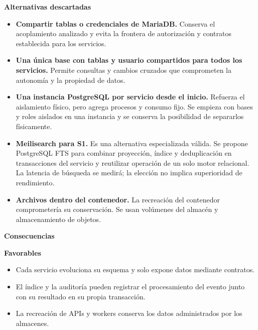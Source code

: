 \par\medskip\noindent\textbf{Alternativas descartadas}\par\nobreak\smallskip

\begin{itemize}[leftmargin=1.5em,itemsep=3pt]
\item \textbf{Compartir tablas o credenciales de MariaDB.} Conserva el acoplamiento analizado y evita la frontera de autorización y contratos establecida para los servicios.
\item \textbf{Una única base con tablas y usuario compartidos para todos los servicios.} Permite consultas y cambios cruzados que comprometen la autonomía y la propiedad de datos.
\item \textbf{Una instancia PostgreSQL por servicio desde el inicio.} Refuerza el aislamiento físico, pero agrega procesos y consumo fijo. Se empieza con bases y roles aislados en una instancia y se conserva la posibilidad de separarlos físicamente.
\item \textbf{Meilisearch para S1.} Es una alternativa especializada válida. Se propone PostgreSQL FTS para combinar proyección, índice y deduplicación en transacciones del servicio y reutilizar operación de un solo motor relacional. La latencia de búsqueda se medirá; la elección no implica superioridad de rendimiento.
\item \textbf{Archivos dentro del contenedor.} La recreación del contenedor comprometería su conservación. Se usan volúmenes del almacén y almacenamiento de objetos.
\end{itemize}

\par\medskip\noindent\textbf{Consecuencias}\par\nobreak\smallskip

\par\medskip\noindent\textbf{Favorables}\par\nobreak\smallskip

\begin{itemize}[leftmargin=1.5em,itemsep=3pt]
\item Cada servicio evoluciona su esquema y solo expone datos mediante contratos.
\item El índice y la auditoría pueden registrar el procesamiento del evento junto con su resultado en su propia transacción.
\item La recreación de APIs y workers conserva los datos administrados por los almacenes.
\end{itemize}

